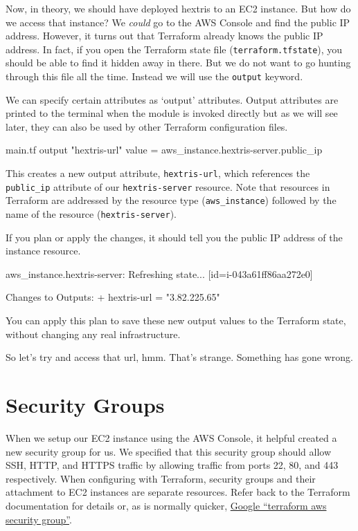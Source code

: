 \documentclass{csse4400}
\begin{document}
Now, in theory, we should have deployed hextris to an EC2 instance.
But how do we access that instance?
We \textsl{could} go to the AWS Console and find the public IP address.
However, it turns out that Terraform already knows the public IP address.
In fact, if you open the Terraform state file (\texttt{terraform.tfstate}),
you should be able to find it hidden away in there.
But we do not want to go hunting through this file all the time.
Instead we will use the \texttt{output} keyword.

We can specify certain attributes as `output' attributes.
Output attributes are printed to the terminal when the module is invoked directly
but as we will see later, they can also be used by other Terraform configuration files.

\begin{code}[language=terraform,numbers=none]{main.tf}
output "hextris-url" {
  value = aws_instance.hextris-server.public_ip
}
\end{code}

This creates a new output attribute, \texttt{hextris-url},
which references the \texttt{public\_ip} attribute of our \texttt{hextris-server} resource.
Note that resources in Terraform are addressed by the resource type (\texttt{aws\_instance})
followed by the name of the resource (\texttt{hextris-server}).

If you plan or apply the changes, it should tell you the public IP address of the instance resource.

\begin{code}[numbers=none]{}
aws_instance.hextris-server: Refreshing state... [id=i-043a61ff86aa272e0]

Changes to Outputs:
  + hextris-url = "3.82.225.65"
\end{code}

You can apply this plan to save these new output values to the Terraform state, without changing any real infrastructure.  

So let's try and access that url, hmm.
That's strange. Something has gone wrong.

\section{Security Groups}
When we setup our EC2 instance using the AWS Console,
it helpful created a new security group for us.
We specified that this security group should allow SSH, HTTP, and HTTPS traffic by allowing traffic from ports 22, 80, and 443 respectively.
When configuring with Terraform, security groups and their attachment to EC2 instances are separate resources.
Refer back to the Terraform documentation for details or,
as is normally quicker, \href{https://www.google.com/search?q=terraform+aws+security+group}{Google ``terraform aws security group''}.
\end{document}
